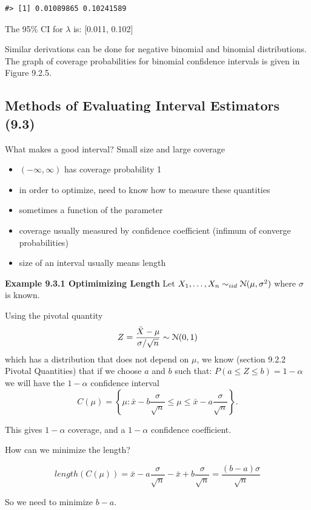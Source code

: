 \documentclass[11pt,]{article}
\newcommand{\Xndots}{X_1, \ldots, X_n}
\def\xbar{\bar{ x}}
\def\Xbar{\bar{ X}}
\def\Nsc{{\cal N}}
\begin{document}
\begin{verbatim}
#> [1] 0.01089865 0.10241589
\end{verbatim}

The 95\% CI for \(\lambda\) is: {[}0.011, 0.102{]}

Similar derivations can be done for negative binomial and binomial
distributions. The graph of coverage probabilities for binomial
confidence intervals is given in Figure 9.2.5.

\subsection{Methods of Evaluating Interval Estimators (9.3)}

What makes a good interval? Small size and large coverage

\begin{itemize}
    \item $(-\infty,\infty)$ has coverage probability 1
    \item in order to optimize, need to know how to measure these quantities
    \item sometimes a function of the parameter
    \item coverage usually measured by confidence coefficient (infimum of converge probabilities)
    \item size of an interval usually means length
    \end{itemize}

\noindent\textbf{Example 9.3.1 Optimimizing Length} Let
\(\Xndots \sim_{iid} \Nsc(\mu,\sigma^2)\) where \(\sigma\) is known.

Using the pivotal quantity
\[Z = \frac{\Xbar - \mu}{\sigma/\sqrt{n}} \sim \Nsc(0,1)\] which has a
distribution that does not depend on \(\mu\), we know (section 9.2.2
Pivotal Quantities) that if we choose \(a\) and \(b\) such that:
\(P(a \leq Z \leq b) =1-\alpha\) we will have the \(1-\alpha\)
confidence interval
\[C(\mu) = \left\{ \mu: \xbar - b \frac{\sigma}{\sqrt{n}} \leq \mu \leq \xbar - a \frac{\sigma}{\sqrt{n}}\right\}.\]

This gives \(1-\alpha\) coverage, and a \(1-\alpha\) confidence
coefficient.

How can we minimize the length?

\[length(C(\mu)) = \xbar - a \frac{\sigma}{\sqrt{n}} - \xbar + b \frac{\sigma}{\sqrt{n}} =  \frac{(b-a)\sigma}{\sqrt{n}}\]

So we need to minimize \(b-a\).
\end{document}
